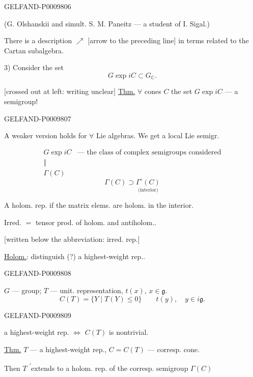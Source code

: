 \begin{GelfandAdjacentEvidence}{GELFAND-P000980}{6}


(G. Olshanskii and simult. S. M. Paneitz --- a student of I. Sigal.)

There is a description $\nearrow$ [arrow to the preceding line] in terms related to the Cartan subalgebra.

3) Consider the set
\[
 G\exp iC\subset G_{\mathbb C}.
\]

[crossed out at left: writing unclear] \underline{Thm.} $\forall$ cones $C$ the set $G\exp iC$ --- a semigroup!
\end{GelfandAdjacentEvidence}
\begin{GelfandAdjacentEvidence}{GELFAND-P000980}{7}


A weaker version holds for $\forall$ Lie algebras. We get a local Lie semigr.

\[
\begin{array}{cl}
 G\exp iC & \text{--- the class of complex semigroups considered}\\
 \Vert &\\
 \Gamma(C) &
\end{array}
\]
\[
 \Gamma(C)\supset \underset{\text{(interior)}}{\Gamma^\circ(C)}
\]

A holom. rep. if the matrix elems. are holom. in the interior.

Irred. $=$ tensor prod. of holom. and antiholom..

[written below the abbreviation: irred. rep.]

\underline{Holom.}: distinguish (?) a highest-weight rep..
\end{GelfandAdjacentEvidence}
\begin{GelfandAdjacentEvidence}{GELFAND-P000980}{8}


$G$ --- group; $T$ --- unit. representation, $t(x)$, $x\in\mathfrak g$.
\[
 C(T)=\{Y\mid T(Y)\leqslant 0\}\qquad t(y),\quad y\in i\mathfrak g.
\]
\end{GelfandAdjacentEvidence}
\begin{GelfandAdjacentEvidence}{GELFAND-P000980}{9}


a highest-weight rep. $\Leftrightarrow$ $C(T)$ is nontrivial.

\underline{Thm.} $T$ --- a highest-weight rep., $C=C(T)$ --- corresp. cone.

Then $T$ \textsuperscript{\(\prime\)}extends to a holom. rep. of the corresp. semigroup $\Gamma(C)$
\end{GelfandAdjacentEvidence}
